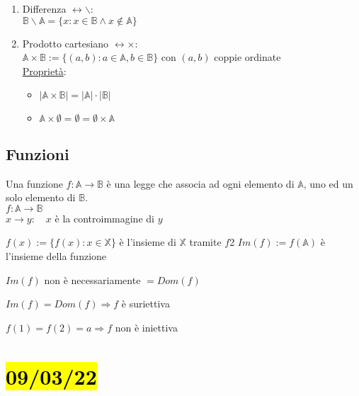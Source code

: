 \documentclass{article}
\begin{document}
\begin{enumerate}
\begin{itemize}
	      \end{itemize}
	\item Differenza $\leftrightarrow\backslash$:\\
	      $\mathbb{B}\backslash\mathbb{A}=\{x:x\in\mathbb{B}\wedge x\not\in\mathbb{A}\}$
	\item Prodotto cartesiano $\leftrightarrow\times$:\\
	      $\mathbb{A}\times\mathbb{B}:=\{(a,b):a\in\mathbb{A},b\in\mathbb{B}\}$ con $(a,b)$ coppie ordinate\\
	      \ul{Proprietà}:
	      \begin{itemize}
		      \item $|\mathbb{A}\times\mathbb{B}|=|\mathbb{A}|\cdot|\mathbb{B}|$
		      \item $\mathbb{A}\times\emptyset=\emptyset=\emptyset\times\mathbb{A}$
	      \end{itemize}
\end{enumerate}
\subsection*{Funzioni}
{Una funzione $f:\mathbb{A}\rightarrow\mathbb{B}$ è una legge che associa ad ogni elemento di $\mathbb{A}$, uno ed un solo elemento di $\mathbb{B}$.\\
	$f:\mathbb{A}\rightarrow\mathbb{B}$\\
	\hspace*{1.6em}$x\rightarrow y:\quad x$ è la controimmagine di $y$}
{$f(x):=\{f(x):x\in\mathbb{X}\}$ è l'insieme di $\mathbb{X}$ tramite $f$2
	$Im(f):=f(\mathbb{A})$ è l'insieme della funzione

	$Im(f)$ non è necessariamente $=Dom(f)$

	$Im(f)=Dom(f)\Rightarrow f$ è suriettiva

	$f(1)=f(2)=a\Rightarrow f$ non è iniettiva}
\section{\hl{09/03/22}}
\end{document}
